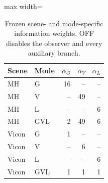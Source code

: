 \begin{table}[tb]
\caption{Frozen scene- and mode-specific information weights. OFF disables the observer and every auxiliary branch.}\label{tab:weights}
\centering\small
\begin{adjustbox}{max width=\columnwidth}
\begin{tabular}{llrrr}
\toprule
Scene & Mode & $\alpha_G$ & $\alpha_V$ & $\alpha_L$ \\
\midrule
MH & G & 16 & -- & -- \\
MH & V & -- & 49 & -- \\
MH & L & -- & -- & 6 \\
MH & GVL & 2 & 49 & 6 \\
Vicon & G & 1 & -- & -- \\
Vicon & V & -- & 6 & -- \\
Vicon & L & -- & -- & 6 \\
Vicon & GVL & 1 & 1 & 1 \\
\bottomrule
\end{tabular}
\end{adjustbox}
\end{table}

